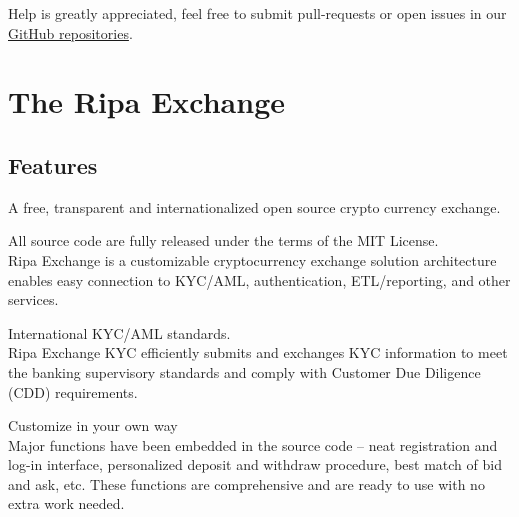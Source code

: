 \documentclass[11pt,fleqn,oneside]{book} %
\begin{document}
Help is greatly appreciated, feel free to submit pull-requests or open issues in our \href{https://github.com/RipaEx}{GitHub repositories}.

\section{The Ripa Exchange}
\subsection{Features}
A free, transparent and internationalized open source crypto currency exchange.

\begin{tcolorbox}[featureBox,
	title=\textsc{Open Source} \faCircleONotch]

	\small	All source code are fully released under the terms of the MIT License.\\\vspace{5mm}
	\tiny Ripa Exchange is a customizable cryptocurrency exchange solution architecture enables easy connection to KYC/AML, 
	authentication, ETL/reporting, and other services.
\end{tcolorbox}
\begin{tcolorbox}[featureBox,
	title=\textsc{Compliant} \faCheck]

	\small	International KYC/AML standards.\\\vspace{5mm}
	\tiny Ripa Exchange KYC efficiently submits and exchanges KYC information 
	to meet the banking supervisory standards and comply with Customer Due Diligence (CDD) requirements.
\end{tcolorbox}
\begin{tcolorbox}[featureBox,
	title=\textsc{Transparent \& Configurable} \faCogs]

	\small	Customize in your own way\\\vspace{5mm}
	\tiny Major functions have been embedded in the source code – neat registration and log-in interface, 
	personalized deposit and withdraw procedure, best match of bid and ask, etc. These functions are comprehensive 
	and are ready to use with no extra work needed. 
\end{tcolorbox}
\end{document}
